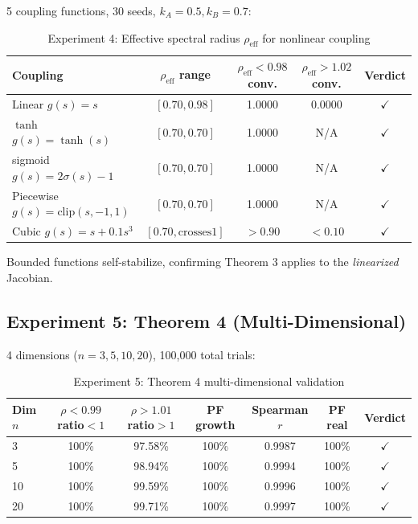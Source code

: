 \documentclass[12pt,a4paper]{article}
\theoremstyle{definition}
\begin{document}
5 coupling functions, 30 seeds, $k_A=0.5, k_B=0.7$:

\begin{table}[htbp]
\centering
\caption{Experiment 4: Effective spectral radius $\rho_{\mathrm{eff}}$ for nonlinear coupling}
\label{tab:exp4-en}
\begin{tabular}{lcccc}
\toprule
Coupling & $\rho_{\mathrm{eff}}$ range & $\rho_{\mathrm{eff}} < 0.98$ conv. & $\rho_{\mathrm{eff}} > 1.02$ conv. & Verdict \\
\midrule
Linear $g(s)=s$ & $[0.70, 0.98]$ & 1.0000 & 0.0000 & $\checkmark$ \\
$\tanh$ $g(s)=\tanh(s)$ & $[0.70, 0.70]$ & 1.0000 & N/A & $\checkmark$ \\
sigmoid $g(s)=2\sigma(s)-1$ & $[0.70, 0.70]$ & 1.0000 & N/A & $\checkmark$ \\
Piecewise $g(s)=\mathrm{clip}(s,-1,1)$ & $[0.70, 0.70]$ & 1.0000 & N/A & $\checkmark$ \\
Cubic $g(s)=s+0.1s^3$ & $[0.70, \text{crosses}1]$ & $>0.90$ & $<0.10$ & $\checkmark$ \\
\bottomrule
\end{tabular}
\end{table}

Bounded functions self-stabilize, confirming Theorem 3 applies to the \emph{linearized} Jacobian.

\subsection{Experiment 5: Theorem 4 (Multi-Dimensional)}

4 dimensions ($n = 3, 5, 10, 20$), 100,000 total trials:

\begin{table}[htbp]
\centering
\caption{Experiment 5: Theorem 4 multi-dimensional validation}
\label{tab:exp5-en}
\begin{tabular}{lcccccc}
\toprule
Dim $n$ & $\rho<0.99$ ratio$<1$ & $\rho>1.01$ ratio$>1$ & PF growth & Spearman $r$ & PF real & Verdict \\
\midrule
3 & 100\% & 97.58\% & 100\% & 0.9987 & 100\% & $\checkmark$ \\
5 & 100\% & 98.94\% & 100\% & 0.9994 & 100\% & $\checkmark$ \\
10 & 100\% & 99.59\% & 100\% & 0.9996 & 100\% & $\checkmark$ \\
20 & 100\% & 99.71\% & 100\% & 0.9997 & 100\% & $\checkmark$ \\
\bottomrule
\end{tabular}
\end{table}
\end{document}
